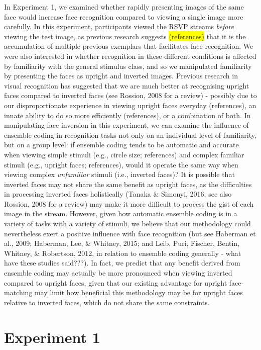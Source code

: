 \documentclass[
  english,
  man]{apa6}
\begin{document}
In Experiment 1, we examined whether rapidly presenting images of the same face would increase face recognition compared to viewing a single image more carefully. In this experiment, participants viewed the RSVP streams \emph{before} viewing the test image, as previous research suggests \colorbox{yellow}{(references)} that it is the accumulation of multiple previous exemplars that facilitates face recognition. We were also interested in whether recognition in these different conditions is affected by familiarity with the general stimulus class, and so we manipulated familiarity by presenting the faces as upright and inverted images. Previous research in visual recognition has suggested that we are much better at recognising upright faces compared to inverted faces (see Rossion, 2008 for a review) - possibly due to our disproportionate experience in viewing upright faces everyday (references), an innate ability to do so more efficiently (references), or a combination of both. In manipulating face inversion in this experiment, we can examine the influence of ensemble coding in recognition tasks not only on an individual level of familiarity, but on a group level: if ensemble coding tends to be automatic and accurate when viewing simple stimuli (e.g., circle size; references) and complex familiar stimuli (e.g., upright faces; references), would it operate the same way when viewing complex \emph{unfamiliar} stimuli (i.e., inverted faces)? It is possible that inverted faces may not share the same benefit as upright faces, as the difficulties in processing inverted faces holistically (Tanaka \& Simonyi, 2016; see also Rossion, 2008 for a review) may make it more difficult to process the gist of each image in the stream. However, given how automatic ensemble coding is in a variety of tasks with a variety of stimuli, we believe that our methodology could nevertheless exert a positive influence with face recognition (but see Haberman et al., 2009; Haberman, Lee, \& Whitney, 2015; and Leib, Puri, Fischer, Bentin, Whitney, \& Robertson, 2012, in relation to ensemble coding generally - what have these studies said???). In fact, we predict that any benefit derived from ensemble coding may actually be more pronounced when viewing inverted compared to upright faces, given that our existing advantage for upright face-matching may limit how beneficial this methodology may be for upright faces relative to inverted faces, which do not share the same constraints.

\hypertarget{experiment-1}{%
\section{Experiment 1}\label{experiment-1}}
\end{document}
